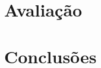 \documentclass[doutorado, pre-defesa, spanish, english, brazil]{packages/icmc}
\begin{document}
\chapter{Avaliação}\label{chapter:avaliacao}


\chapter{Conclusões}\label{chapter:conclusoes}




% 

\postextual




%


    


%    
    
\end{document}
